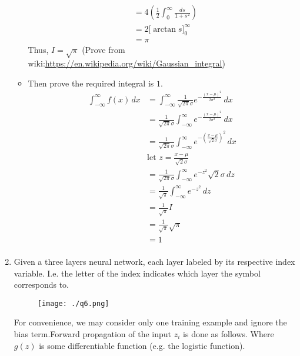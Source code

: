\documentclass[12pt, a4paper]{article}
\begin{document}
\begin{enumerate}
\begin{itemize}
\begin{align*}
        &=4\left({\frac {1}{2}}\int _{0}^{\infty }{\frac {ds}{1+s^{2}}}\right)\\
        &=2{\Big [}\arctan s{\Big ]}_{0}^{\infty }\\
        &=\pi
    \end{align*}
    Thus, $I = \sqrt{\pi}$ (Prove from wiki:\url{https://en.wikipedia.org/wiki/Gaussian\_integral})\\
    \item Then prove the required integral is $1$.
    \begin{align*}
        \int_{-\infty}^{\infty} f(x)\,dx &= \int_{-\infty}^{\infty} \frac{1}{\sqrt{2\pi}\sigma}e^{-\frac{(x-\mu)^2}{2\sigma^2}}\,dx\\
        &= \frac{1}{\sqrt{2\pi}\sigma}\int_{-\infty}^{\infty}e^{-\frac{(x-\mu)^2}{2\sigma^2}}\,dx\\
        &= \frac{1}{\sqrt{2\pi}\sigma}\int_{-\infty}^{\infty}e^{-(\frac{x-\mu}{\sqrt{2}\sigma})^2}\,dx\\
        &\text{let } z = \frac{x-\mu}{\sqrt{2}\sigma}\\
        &= \frac{1}{\sqrt{2\pi}\sigma}\int_{-\infty}^{\infty}e^{-z^2}\sqrt{2}\sigma\,dz\\
        &= \frac{1}{\sqrt{\pi}}\int_{-\infty}^{\infty}e^{-z^2}\,dz\\
        &= \frac{1}{\sqrt{\pi}}I\\
        &= \frac{1}{\sqrt{\pi}}\sqrt{\pi}\\
        &= 1\\
    \end{align*}
\end{itemize}
\item Given a three layers neural network, each layer labeled by its respective
index variable. I.e. the letter of the index indicates which layer the symbol corresponds to.
\begin{figure}[h]
    \centering
    \texttt{[image: ./q6.png]}
\end{figure}
For convenience, we may consider only one training example and ignore the bias term.Forward propagation of the input $z_i$ is done as follows. Where $g(z)$ is some differentiable function (e.g. the logistic function).



\end{enumerate}
\end{document}
